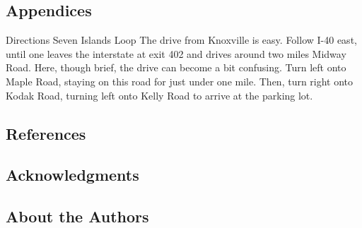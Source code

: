 \documentclass[
  letterpaper,
  DIV=11,
  numbers=noendperiod]{scrartcl}
\begin{document}
\hypertarget{appendices}{%
\subsection{Appendices}\label{appendices}}

Directions Seven Islands Loop The drive from Knoxville is easy. Follow
I-40 east, until one leaves the interstate at exit 402 and drives around
two miles Midway Road. Here, though brief, the drive can become a bit
confusing. Turn left onto Maple Road, staying on this road for just
under one mile. Then, turn right onto Kodak Road, turning left onto
Kelly Road to arrive at the parking lot.

\hypertarget{references}{%
\subsection{References}\label{references}}

\hypertarget{acknowledgments}{%
\subsection{Acknowledgments}\label{acknowledgments}}

\hypertarget{about-the-authors}{%
\subsection{About the Authors}\label{about-the-authors}}
\end{document}
